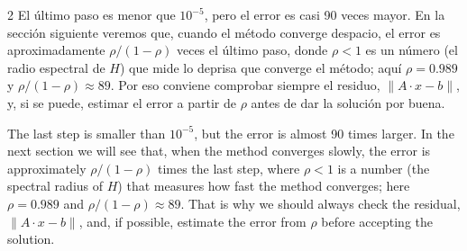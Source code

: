 \begin{paracol}{2}
El último paso es menor que $10^{-5}$, pero el error es casi 90 veces mayor. En la sección siguiente veremos que, cuando el método converge despacio, el error es aproximadamente $\rho/(1-\rho)$ veces el último paso, donde $\rho<1$ es un número (el radio espectral de $H$) que mide lo deprisa que converge el método; aquí $\rho=0.989$ y $\rho/(1-\rho)\approx 89$. Por eso conviene comprobar siempre el residuo, $\lVert A\cdot x - b\rVert$, y, si se puede, estimar el error a partir de $\rho$ antes de dar la solución por buena.

\switchcolumn
The last step is smaller than $10^{-5}$, but the error is almost 90 times larger. In the next section we will see that, when the method converges slowly, the error is approximately $\rho/(1-\rho)$ times the last step, where $\rho<1$ is a number (the spectral radius of $H$) that measures how fast the method converges; here $\rho=0.989$ and $\rho/(1-\rho)\approx 89$. That is why we should always check the residual, $\lVert A\cdot x - b\rVert$, and, if possible, estimate the error from $\rho$ before accepting the solution.
\end{paracol}


